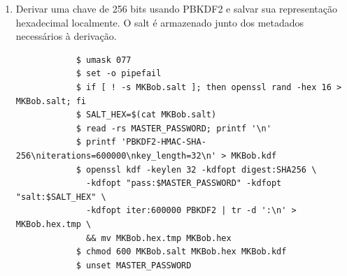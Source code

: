 \begin{enumerate}
	\item Derivar uma chave de 256 bits usando PBKDF2 e salvar sua representação hexadecimal localmente. O salt é armazenado junto dos metadados necessários à derivação.
	\begin{tcolorbox}[width=\textwidth]
	{\footnotesize
		\begin{verbatim}
			$ umask 077
			$ set -o pipefail
			$ if [ ! -s MKBob.salt ]; then openssl rand -hex 16 > MKBob.salt; fi
			$ SALT_HEX=$(cat MKBob.salt)
			$ read -rs MASTER_PASSWORD; printf '\n'
			$ printf 'PBKDF2-HMAC-SHA-256\niterations=600000\nkey_length=32\n' > MKBob.kdf
			$ openssl kdf -keylen 32 -kdfopt digest:SHA256 \
			  -kdfopt "pass:$MASTER_PASSWORD" -kdfopt "salt:$SALT_HEX" \
			  -kdfopt iter:600000 PBKDF2 | tr -d ':\n' > MKBob.hex.tmp \
			  && mv MKBob.hex.tmp MKBob.hex
			$ chmod 600 MKBob.salt MKBob.hex MKBob.kdf
			$ unset MASTER_PASSWORD
		\end{verbatim}
	}
	\end{tcolorbox}
\end{enumerate}

\pagebreak
